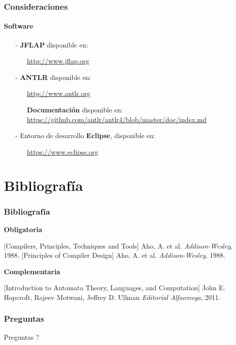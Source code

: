 \documentclass{beamer}
\begin{document}
        \begin{frame}
            \frametitle{Consideraciones}
            \framesubtitle{Software}

            \begin{itemize}
                    \item[-] \textbf{JFLAP} disponible en:
                \begin{itemize}
                    \item[] \url{http://www.jflap.org}
                \end{itemize} 
                \item[-] \textbf{ANTLR} disponible en:
                \begin{itemize}
                    \item[] \url{http://www.antlr.org}
                    \item[] \textbf{Documentaci\'on} disponible en: \url{https://github.com/antlr/antlr4/blob/master/doc/index.md} 
                \end{itemize} 
                \item[-] Entorno de desarrollo \textbf{Eclipse}, disponible en:
                \begin{itemize}
                    \item[] \url{https://www.eclipse.org}
                \end{itemize} 
            \end{itemize}

        \end{frame}

    \section{Bibliograf\'ia}
    
        \begin{frame}
            \frametitle{Bibliograf\'ia}

            \textbf{Obligatoria}
 
            \begin{thebibliography}{10} 
                \beamertemplatebookbibitems
                 [Compilers, Principles, Techniques and Tools] Aho, A. et al. \newblock \emph{Addison-Wesley}, 1988.
                 [Principles of Compiler Design] Aho, A. et al. \newblock \emph{Addison-Wesley}, 1988.
            \end{thebibliography} 

            \vspace{10pt}

            \textbf{Complementaria}

            \begin{thebibliography}{10} 
                \beamertemplatebookbibitems
                [Introduction to Automata Theory, Languages, and Computation] John E. Hopcroft, Rajeev Motwani, Jeffrey D. Ullman \newblock \emph{Editorial Alfaomega}, 2011.
             \end{thebibliography} 
        \end{frame}

        \begin{frame}
            \frametitle{Preguntas}

            \hspace{4cm}\huge{Preguntas ?}
        
        \end{frame}
    
\end{document}
